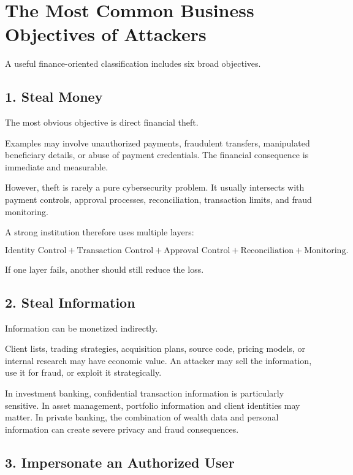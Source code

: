 \section{The Most Common Business Objectives of Attackers}

A useful finance-oriented classification includes six broad objectives.

\subsection{1. Steal Money}

The most obvious objective is direct financial theft.

Examples may involve unauthorized payments, fraudulent transfers, manipulated beneficiary details, or abuse of payment credentials. The financial consequence is immediate and measurable.

However, theft is rarely a pure cybersecurity problem. It usually intersects with payment controls, approval processes, reconciliation, transaction limits, and fraud monitoring.

A strong institution therefore uses multiple layers:

\begin{equation}
\text{Identity Control}
+
\text{Transaction Control}
+
\text{Approval Control}
+
\text{Reconciliation}
+
\text{Monitoring}.
\end{equation}

If one layer fails, another should still reduce the loss.

\subsection{2. Steal Information}

Information can be monetized indirectly.

Client lists, trading strategies, acquisition plans, source code, pricing models, or internal research may have economic value. An attacker may sell the information, use it for fraud, or exploit it strategically.

In investment banking, confidential transaction information is particularly sensitive. In asset management, portfolio information and client identities may matter. In private banking, the combination of wealth data and personal information can create severe privacy and fraud consequences.

\subsection{3. Impersonate an Authorized User}

